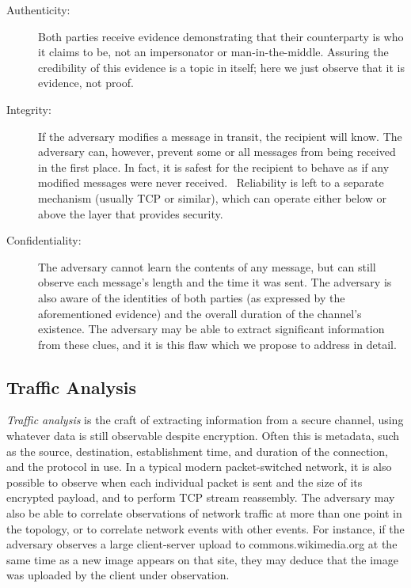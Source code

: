 \documentclass[oneside,tinymargin]{zarticle}
\begin{document}
\begin{multicols}{2}
\begin{description}
\item[Authenticity:] Both parties receive evidence demonstrating that
  their counterparty is who it claims to be, not an impersonator or
  man-in-the-middle.  Assuring the credibility of this evidence is a
  topic in itself; here we just observe that it is evidence, not
  proof.

\item[Integrity:] If the adversary modifies a message in transit, the
  recipient will know.  The adversary can, however, prevent some or
  all messages from being received in the first place.  In fact, it is
  safest for the recipient to behave as if any modified messages were
  never received.~\cite{mitchell2005error} Reliability is left to a
  separate mechanism (usually TCP or similar), which can operate
  either below or above the layer that provides security.

\item[Confidentiality:] The adversary cannot learn the contents of any
  message, but can still observe each message's length and the time it
  was sent.  The adversary is also aware of the identities of both
  parties (as expressed by the aforementioned evidence) and the
  overall duration of the channel's existence.  The adversary may be
  able to extract significant information from these clues, and it is
  this flaw which we propose to address in detail.
\end{description}

\subsection{Traffic Analysis}

\noindent
\emph{Traffic analysis} is the craft of extracting information from a
secure channel, using whatever data is still observable despite
encryption. Often this is metadata, such as the source, destination,
establishment time, and duration of the connection, and the protocol
in use.  In a typical modern packet-switched network, it is also
possible to observe when each individual packet is sent and the size
of its encrypted payload, and to perform TCP stream reassembly.  The
adversary may also be able to correlate observations of network
traffic at more than one point in the topology, or to correlate
network events with other events.  For instance, if the adversary
observes a large client-server upload to
\textsf{commons.wikimedia.org} at the same time as a new image appears
on that site, they may deduce that the image was uploaded by the
client under observation.


\end{multicols}
\end{document}
